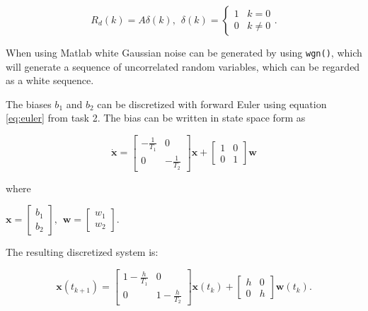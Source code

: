 \documentclass{article}
\begin{document}
\begin{equation}
	R_d(k) = A\delta(k) , \hspace{5pt} \delta(k) =
	\begin{cases}
		1 \hspace{10pt} k = 0 \\
		0 \hspace{10pt} k \neq 0
	\end{cases}.
\end{equation}

When using Matlab white Gaussian noise can be generated by using \texttt{wgn()}, which will generate a sequence of uncorrelated random variables, which can be regarded as a white sequence.

The biases $b_1$ and $b_2$ can be discretized with forward Euler using equation \ref{eq:euler} from task 2. The bias can be written in state space form as

\begin{equation}
	\dot{\bm{x}} = 
	\begin{bmatrix}
		-\frac{1}{T_1} & 0 \\
		0 & -\frac{1}{T_2}
	\end{bmatrix}
	\bm{x} +
	\begin{bmatrix}
		1 & 0 \\
		0 & 1
	\end{bmatrix}
	\bm{w}
\end{equation}

where

\begin{center}
\begin{math}
	\bm{x} =
	\begin{bmatrix}
		b_1 \\ b_2
	\end{bmatrix}
	, \hspace{5pt} \bm{w} =
	\begin{bmatrix}
		w_1 \\ w_2
	\end{bmatrix}
	.
\end{math}
\end{center}

The resulting discretized system is:

\begin{equation}
	\bm{x}(t_{k+1}) =
	\begin{bmatrix}
		1 - \frac{h}{T_1} & 0 \\
		0 & 1 - \frac{h}{T_2}
	\end{bmatrix}
	\bm{x}(t_k) +
	\begin{bmatrix}
		h & 0 \\
		0 & h
	\end{bmatrix}
	\bm{w}(t_k).
\end{equation}
\end{document}
